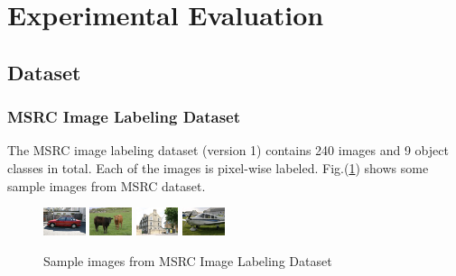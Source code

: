 \documentclass{acm_proc_article-sp}
\begin{document}
\section{Experimental Evaluation}\label{sec:exp}
\subsection{Dataset}
\subsubsection{MSRC Image Labeling Dataset}
The MSRC image labeling dataset (version 1) \cite{msrc} contains 240 images and 9 object classes in total. 
Each of the images is pixel-wise labeled. Fig.(\ref{fig:msrc}) shows some sample images from MSRC dataset.
\begin{figure}[!htb]
\centering
\includegraphics[width=0.11\textwidth]{fig/sample-msrc1}
\includegraphics[width=0.11\textwidth]{fig/sample-msrc2}
\includegraphics[width=0.11\textwidth]{fig/sample-msrc3}
\includegraphics[width=0.11\textwidth]{fig/sample-msrc4}
\caption{Sample images from MSRC Image Labeling Dataset}\label{fig:msrc}
\end{figure}
\end{document}
